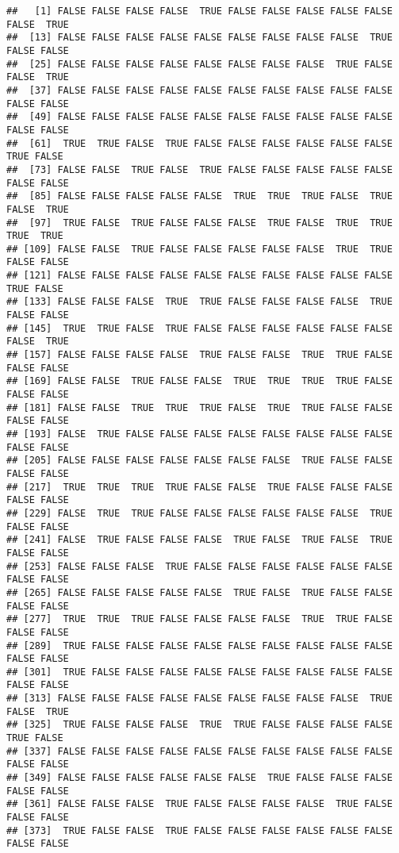 \documentclass[
]{book}
\begin{document}
\begin{verbatim}
##   [1] FALSE FALSE FALSE FALSE  TRUE FALSE FALSE FALSE FALSE FALSE FALSE  TRUE
##  [13] FALSE FALSE FALSE FALSE FALSE FALSE FALSE FALSE FALSE  TRUE FALSE FALSE
##  [25] FALSE FALSE FALSE FALSE FALSE FALSE FALSE FALSE  TRUE FALSE FALSE  TRUE
##  [37] FALSE FALSE FALSE FALSE FALSE FALSE FALSE FALSE FALSE FALSE FALSE FALSE
##  [49] FALSE FALSE FALSE FALSE FALSE FALSE FALSE FALSE FALSE FALSE FALSE FALSE
##  [61]  TRUE  TRUE FALSE  TRUE FALSE FALSE FALSE FALSE FALSE FALSE  TRUE FALSE
##  [73] FALSE FALSE  TRUE FALSE  TRUE FALSE FALSE FALSE FALSE FALSE FALSE FALSE
##  [85] FALSE FALSE FALSE FALSE FALSE  TRUE  TRUE  TRUE FALSE  TRUE FALSE  TRUE
##  [97]  TRUE FALSE  TRUE FALSE FALSE FALSE  TRUE FALSE  TRUE  TRUE  TRUE  TRUE
## [109] FALSE FALSE  TRUE FALSE FALSE FALSE FALSE FALSE  TRUE  TRUE FALSE FALSE
## [121] FALSE FALSE FALSE FALSE FALSE FALSE FALSE FALSE FALSE FALSE  TRUE FALSE
## [133] FALSE FALSE FALSE  TRUE  TRUE FALSE FALSE FALSE FALSE  TRUE FALSE FALSE
## [145]  TRUE  TRUE FALSE  TRUE FALSE FALSE FALSE FALSE FALSE FALSE FALSE  TRUE
## [157] FALSE FALSE FALSE FALSE  TRUE FALSE FALSE  TRUE  TRUE FALSE FALSE FALSE
## [169] FALSE FALSE  TRUE FALSE FALSE  TRUE  TRUE  TRUE  TRUE FALSE FALSE FALSE
## [181] FALSE FALSE  TRUE  TRUE  TRUE FALSE  TRUE  TRUE FALSE FALSE FALSE FALSE
## [193] FALSE  TRUE FALSE FALSE FALSE FALSE FALSE FALSE FALSE FALSE FALSE FALSE
## [205] FALSE FALSE FALSE FALSE FALSE FALSE FALSE  TRUE FALSE FALSE FALSE FALSE
## [217]  TRUE  TRUE  TRUE  TRUE FALSE FALSE  TRUE FALSE FALSE FALSE FALSE FALSE
## [229] FALSE  TRUE  TRUE FALSE FALSE FALSE FALSE FALSE FALSE  TRUE FALSE FALSE
## [241] FALSE  TRUE FALSE FALSE FALSE  TRUE FALSE  TRUE FALSE  TRUE FALSE FALSE
## [253] FALSE FALSE FALSE  TRUE FALSE FALSE FALSE FALSE FALSE FALSE FALSE FALSE
## [265] FALSE FALSE FALSE FALSE FALSE  TRUE FALSE  TRUE FALSE FALSE FALSE FALSE
## [277]  TRUE  TRUE  TRUE FALSE FALSE FALSE FALSE  TRUE  TRUE FALSE FALSE FALSE
## [289]  TRUE FALSE FALSE FALSE FALSE FALSE FALSE FALSE FALSE FALSE FALSE FALSE
## [301]  TRUE FALSE FALSE FALSE FALSE FALSE FALSE FALSE FALSE FALSE FALSE FALSE
## [313] FALSE FALSE FALSE FALSE FALSE FALSE FALSE FALSE FALSE  TRUE FALSE  TRUE
## [325]  TRUE FALSE FALSE FALSE  TRUE  TRUE FALSE FALSE FALSE FALSE  TRUE FALSE
## [337] FALSE FALSE FALSE FALSE FALSE FALSE FALSE FALSE FALSE FALSE FALSE FALSE
## [349] FALSE FALSE FALSE FALSE FALSE FALSE  TRUE FALSE FALSE FALSE FALSE FALSE
## [361] FALSE FALSE FALSE  TRUE FALSE FALSE FALSE FALSE  TRUE FALSE FALSE FALSE
## [373]  TRUE FALSE FALSE  TRUE FALSE FALSE FALSE FALSE FALSE FALSE FALSE FALSE

\end{verbatim}
\end{document}
